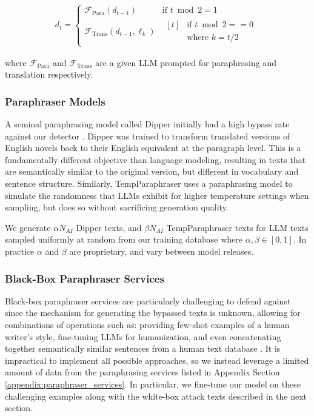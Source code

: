 \documentclass[11pt]{article}
\begin{document}
\begin{align*}
    d_{t} = \begin{cases}
        \mathcal{F}_{\text{Para}}(d_{t-1}) & \text{if } t \bmod 2 = 1 \\
        \mathcal{F}_{\text{Trans}}(d_{t-1}, \ell_{k}) & \!\begin{aligned}[t] 
                                            & \text{if } t \bmod 2 == 0 \\ 
                                            & \text{where } k = t/2 
                                          \end{aligned}
    \end{cases}
\end{align*}

where $\mathcal{F}_{\text{Para}}$ and $\mathcal{F}_{\text{Trans}}$ are a given LLM prompted for paraphrasing and translation respectively.


\subsubsection{Paraphraser Models}
A seminal paraphrasing model called Dipper initially had a high bypass rate against our detector \cite{krishna2023paraphrasing}. Dipper was trained to transform translated versions of English novels back to their English equivalent at the paragraph level. This is a fundamentally different objective than language modeling, resulting in texts that are semantically similar to the original version, but different in vocabulary and sentence structure. Similarly, TempParaphraser uses a paraphrasing model to simulate the randomness that LLMs exhibit for higher temperature settings when sampling, but does so without sacrificing generation quality.

We generate $\alpha N_{AI}$ Dipper texts, and $\beta N_{AI}$ TempParaphraser texts for LLM texts sampled uniformly at random from our training database where $\alpha, \beta \in [0, 1]$. 
In practice $\alpha$ and $\beta$ are proprietary, and vary between model releases.

\subsubsection{Black-Box Paraphraser Services}
Black-box paraphraser services are particularly challenging to defend against since the mechanism for generating the bypassed texts is unknown, allowing for combinations of operations such as: providing few-shot examples of a human writer's style, fine-tuning LLMs for humanization, and even concatenating together semantically similar sentences from a human text database \cite{Chakrabarty2025-ke, Pham2025-fe}. It is impractical to implement all possible approaches, so we instead leverage a limited amount of data from the paraphrasing services listed in Appendix Section \ref{appendix:paraphraser_services}. In particular, we fine-tune our model on these challenging examples along with the white-box attack texts described in the next section.
\end{document}
